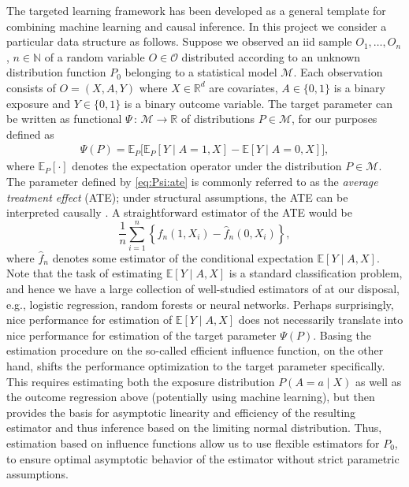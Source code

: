 \documentclass{article}
\newcommand{\EE}{\mathbb{E}}
\newcommand{\R}{\mathbb{R}}
\newcommand{\1}{\mathbb{1}}
\begin{document}
The targeted learning framework has been developed as a general
template for combining machine learning and causal inference. In this
project we consider a particular data structure as follows. Suppose we
observed an iid sample \(O_1,\ldots,O_n\), \(n\in\mathbb{N}\) of a
random variable \(O \in\mathcal{O}\) distributed according to an
unknown distribution function \(P_0\) belonging to a statistical model
\(\mathcal{M}\). Each observation consists of \(O= (X, A, Y)\) where
\(X\in \R^d\) are covariates, \(A\in \lbrace 0,1\rbrace\) is a binary
exposure and \(Y\in\lbrace 0, 1\rbrace\) is a binary outcome
variable. The target parameter can be written as functional
\(\Psi \, : \, \mathcal{M} \rightarrow \R\) of distributions
\(P\in\mathcal{M}\), for our purposes defined as
\begin{align}
  \Psi( P ) = \EE_P \big[ \EE_P[ Y \mid A=1, X] - \EE[ Y\mid A=0,X]\big],
  \label{eq:Psi:ate}
\end{align}
where \(\EE_P[\cdot]\) denotes the expectation operator under the distribution \(P\in \mathcal{M}\).
The parameter defined by \eqref{eq:Psi:ate} is commonly referred to as the \textit{average treatment
  effect} (ATE); under structural assumptions, the ATE can be interpreted causally
\citep{hernanrobins}. A straightforward estimator of the ATE would be
\begin{equation*}
  \frac{1}{n} \sum_{i=1}^{n}
  \left\{
    \hat{f}_n(1, X_i) - \hat{f}_n(0, X_i)
  \right\},
\end{equation*}
where $\hat{f}_n$ denotes some estimator of the conditional
expectation $\EE[Y \mid A, X]$. Note that the task of estimating
$\EE[Y \mid A, X]$ is a standard classification problem, and hence we
have a large collection of well-studied estimators of at our disposal,
e.g., logistic regression, random forests or neural networks. Perhaps
surprisingly, nice performance for estimation of $\EE[Y \mid A, X]$
does not necessarily translate into nice performance for estimation of
the target parameter $\Psi(P)$. Basing the estimation procedure on the
so-called efficient influence function, on the other hand, shifts the
performance optimization to the target parameter specifically. This
requires estimating both the exposure distribution \(P(A=a \mid X)\)
as well as the outcome regression above (potentially using machine
learning), but then provides the basis for asymptotic linearity and
efficiency of the resulting estimator and thus inference based on the
limiting normal distribution. Thus, estimation based on influence
functions allow us to use flexible estimators for \(P_0\), to ensure
optimal asymptotic behavior of the estimator without strict parametric
assumptions.
\end{document}
